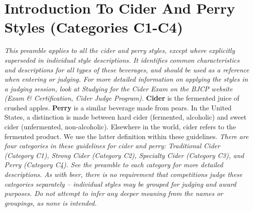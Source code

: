 \section*{Introduction To Cider And Perry Styles (Categories C1-C4)}
\textit{This preamble applies to all the cider and perry styles, except where explicitly superseded in individual style descriptions. It identifies common characteristics and descriptions for all types of these beverages, and should be used as a reference when entering or judging. For more detailed information on applying the styles in a judging session, look at Studying for the Cider Exam on the BJCP website (Exam \& Certification, Cider Judge Program).}
\textbf{Cider} is the fermented juice of crushed apples. \textbf{Perry} is a similar beverage made from pears. In the United States, a distinction is made between hard cider (fermented, alcoholic) and sweet cider (unfermented, non-alcoholic). Elsewhere in the world, cider refers to the fermented product. We use the latter definition within these guidelines.
\textit{There are four categories in these guidelines for cider and perry: Traditional Cider (Category C1), Strong Cider (Category C2), Specialty Cider (Category C3), and Perry (Category C4). See the preamble to each category for more detailed descriptions. As with beer, there is no requirement that competitions judge these categories separately – individual styles may be grouped for judging and award purposes. Do not attempt to infer any deeper meaning from the names or groupings, as none is intended.}
